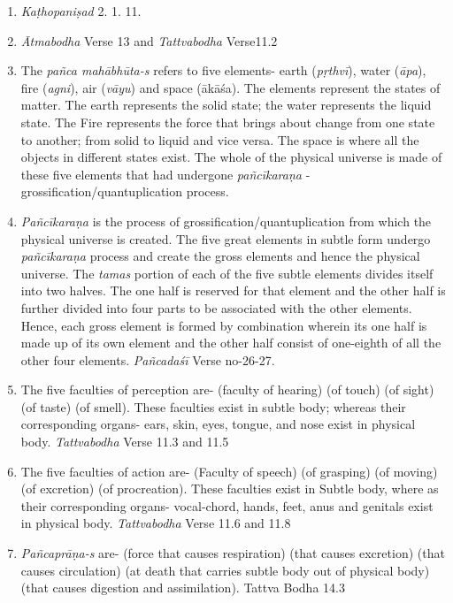 \begin{enumerate}
\item
  \emph{Kaṭhopaniṣad} 2. 1. 11.
\item
  \emph{Ātmabodha} Verse 13 and \emph{Tattvabodha} Verse11.2
\item
  The \emph{pañca mahābhūta-s} refers to five elements- earth (\emph{pṛthvī}), water (\emph{āpa}), fire (\emph{agni}), air (\emph{vāyu}) and space (ākāśa). The elements represent the states of matter. The earth represents the solid state; the water represents the liquid state. The Fire represents the force that brings about change from one state to another; from solid to liquid and vice versa. The space is where all the objects in different states exist. The whole of the physical universe is made of these five elements that had undergone \emph{pañcīkaraṇa} - grossification/quantuplication process.
\item
  \emph{Pañcīkaraṇa} is the process of grossification/quantuplication from which the physical universe is created. The five great elements in subtle form undergo \emph{pañcīkaraṇa} process and create the gross elements and hence the physical universe. The \emph{tamas} portion of each of the five subtle elements divides itself into two halves. The one half is reserved for that element and the other half is further divided into four parts to be associated with the other elements. Hence, each gross element is formed by combination wherein its one half is made up of its own element and the other half consist of one-eighth of all the other four elements. \emph{Pañcadaśī} Verse no-26-27.
\item
  The five faculties of perception are-  (faculty of hearing)  (of touch)  (of sight)  (of taste)  (of smell). These faculties exist in subtle body; whereas their corresponding organs- ears, skin, eyes, tongue, and nose exist in physical body. \emph{Tattvabodha} Verse 11.3 and 11.5
\item
  The five faculties of action are-  (Faculty of speech)  (of grasping)  (of moving)  (of excretion)  (of procreation). These faculties exist in Subtle body, where as their corresponding organs- vocal-chord, hands, feet, anus and genitals exist in physical body. \emph{Tattvabodha} Verse 11.6 and 11.8
\item
  \emph{Pañcaprāṇa-s} are-  (force that causes respiration)  (that causes excretion)  (that causes circulation)  (at death that carries subtle body out of physical body)  (that causes digestion and assimilation). Tattva Bodha 14.3

\end{enumerate}
